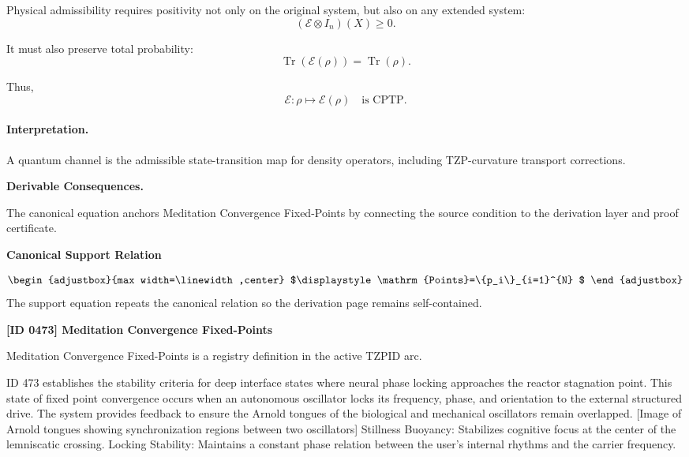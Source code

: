 Physical admissibility requires positivity not only on the original system, but also on any extended system:
\begin{equation}
(\mathcal{E}\otimes I_n)(X)\geq 0 .
\end{equation}

It must also preserve total probability:
\begin{equation}
\operatorname{Tr}(\mathcal{E}(\rho))=\operatorname{Tr}(\rho).
\end{equation}

Thus,
\begin{equation}
\boxed{
\mathcal{E}:\rho\mapsto\mathcal{E}(\rho)
\quad
\text{is CPTP}.
}
\end{equation}

\paragraph{Interpretation.}
A quantum channel is the admissible state-transition map for density operators, including TZP-curvature transport corrections.

\par\vspace{0.35em}
\noindent\textbf{Derivable Consequences.}\quad
\begingroup
\footnotesize
\raggedright
The canonical equation anchors Meditation Convergence Fixed-Points by connecting the source condition to the derivation layer and proof certificate.
\par\endgroup

\noindent\textbf{Canonical Support Relation}\par
\[
\begin{adjustbox}{max width=\linewidth,center}
$\displaystyle
\mathrm{Points}=\{p_i\}_{i=1}^{N}
$
\end{adjustbox}
\]
\noindent The support equation repeats the canonical relation so the derivation page remains self-contained.\par

\clearpage
\noindent\textbf{[ID 0473] Meditation Convergence Fixed-Points}\par
\vspace{0.35em}
\begingroup\small
{}
Meditation Convergence Fixed-Points is a registry definition in the active TZPID arc.

ID 473 establishes the stability criteria for deep interface states where neural phase locking approaches the reactor stagnation point. This state of fixed point convergence occurs when an autonomous oscillator locks its frequency, phase, and orientation to the external structured drive. The system provides feedback to ensure the Arnold tongues of the biological and mechanical oscillators remain overlapped. [Image of Arnold tongues showing synchronization regions between two oscillators] Stillness Buoyancy: Stabilizes cognitive focus at the center of the lemniscatic crossing. Locking Stability: Maintains a constant phase relation between the user's internal rhythms and the carrier frequency.

